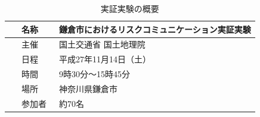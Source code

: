 \documentclass[a4paper]{jsarticle}
\begin{document}
\begin{table}[H]
  \begin{center}
    \caption{実証実験の概要}
    \renewcommand\arraystretch{1.4}
    \begin{tabular}{|c|l|}
      \hline
      名称 & 鎌倉市におけるリスクコミュニケーション実証実験 \\
      \hline
      主催 & 国土交通省 国土地理院 \\
      \hline
      日程 & 平成27年11月14日（土） \\
      \hline
      時間 & 9時30分～15時45分 \\
      \hline
      場所 & 神奈川県鎌倉市 \\
      \hline
      　参加者　 & 約70名 \\
      \hline
    \end{tabular}
    \label{tab:kamakura-general}
  \end{center}
\end{table}
\end{document}
